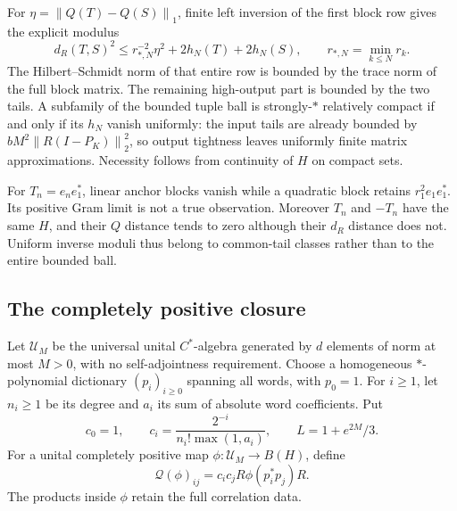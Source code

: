 \documentclass[11pt,a4paper]{amsart}
\numberwithin{equation}{section}
\theoremstyle{definition}
\theoremstyle{remark}
\newcommand{\norm}[1]{\left\lVert#1\right\rVert}
\begin{document}
For $\eta=\norm{Q(T)-Q(S)}_1$, finite left inversion of the first block row gives the explicit modulus
\begin{equation}\label{eq:strongmodulus}
 d_R(T,S)^2\le r_{*,N}^{-2}\eta^2+2h_N(T)+2h_N(S),
 \qquad r_{*,N}=\min_{k\le N}r_k.
\end{equation}
The Hilbert--Schmidt norm of that entire row is bounded by the trace norm of the full block matrix. The remaining high-output part is bounded by the two tails. A subfamily of the bounded tuple ball is strongly-$*$ relatively compact if and only if its $h_N$ vanish uniformly: the input tails are already bounded by $bM^2\norm{R(I-P_K)}_2^2$, so output tightness leaves uniformly finite matrix approximations. Necessity follows from continuity of $H$ on compact sets.

For $T_n=e_ne_1^*$, linear anchor blocks vanish while a quadratic block retains $r_1^2e_1e_1^*$. Its positive Gram limit is not a true observation. Moreover $T_n$ and $-T_n$ have the same $H$, and their $Q$ distance tends to zero although their $d_R$ distance does not. Uniform inverse moduli thus belong to common-tail classes rather than to the entire bounded ball.

\subsection{The completely positive closure}
Let $\mathcal U_M$ be the universal unital $C^*$-algebra generated by $d$ elements of norm at most $M>0$, with no self-adjointness requirement. Choose a homogeneous $*$-polynomial dictionary $(p_i)_{i\ge0}$ spanning all words, with $p_0=1$. For $i\ge1$, let $n_i\ge1$ be its degree and $a_i$ its sum of absolute word coefficients. Put
\[
 c_0=1,\qquad c_i=\frac{2^{-i}}{n_i!\max(1,a_i)},\qquad
 L=1+e^{2M}/3.
\]
For a unital completely positive map $\phi:\mathcal U_M\to B(H)$, define
\begin{equation}\label{eq:ucpcode}
 \mathcal Q(\phi)_{ij}=c_ic_jR\phi(p_i^*p_j)R.
\end{equation}
The products inside $\phi$ retain the full correlation data.
\end{document}
